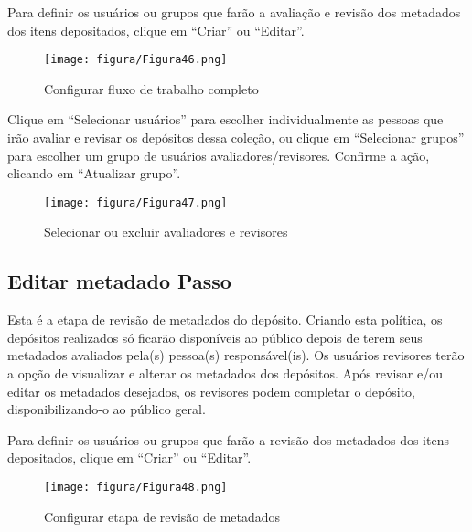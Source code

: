 \documentclass[12pt,hidelinks]{article}
\begin{document}
    \singlespacing
    
    Para definir os usuários ou grupos que farão a avaliação e revisão dos metadados dos itens depositados, clique em “Criar” ou “Editar”.
    
    \begin{figure}[!htp]
                \centering
                \texttt{[image: figura/Figura46.png]}
                \caption{Configurar fluxo de trabalho completo}
            \label{Rotulo}
        \end{figure}
    
    Clique em “Selecionar usuários” para escolher individualmente as pessoas que irão avaliar e revisar os depósitos dessa coleção, ou clique em “Selecionar grupos” para escolher um grupo de usuários avaliadores/revisores. Confirme a ação, clicando em “Atualizar grupo”.
    
    \begin{figure}[!htp]
                \centering
                \texttt{[image: figura/Figura47.png]}
                \caption{Selecionar ou excluir avaliadores e revisores}
            \label{Rotulo}
        \end{figure}
    
\newpage

    \subsection{Editar metadado Passo}
    
    Esta é a etapa de revisão de metadados do depósito. Criando esta política, os depósitos realizados só ficarão disponíveis ao público depois de terem seus metadados avaliados pela(s) pessoa(s) responsável(is). Os usuários revisores terão a opção de visualizar e alterar os metadados dos depósitos. Após revisar e/ou editar os metadados desejados, os revisores podem completar o depósito, disponibilizando-o ao público geral.
    
    \singlespacing
    
    Para definir os usuários ou grupos que farão a revisão dos metadados dos itens depositados, clique em “Criar” ou “Editar”.
    
    \begin{figure}[!htp]
                \centering
                \texttt{[image: figura/Figura48.png]}
                \caption{Configurar etapa de revisão de metadados}
            \label{Rotulo}
        \end{figure}
    
\end{document}
